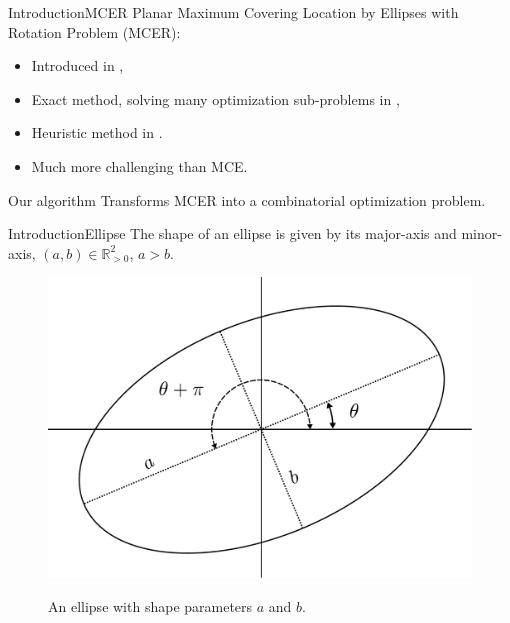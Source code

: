 \documentclass{beamer}
\theoremstyle{definition}
\begin{document}
\begin{frame}{Introduction}{MCER}
	Planar Maximum Covering Location by Ellipses with Rotation Problem (MCER):
	\begin{itemize}
		\item Introduced in \cite{andreta}, 
		\item Exact method, solving many optimization sub-problems in \cite{canbolat},
		\item Heuristic method in \cite{andreta}.
		\item Much more challenging than MCE.
	\end{itemize}
	
	\begin{block}{Our algorithm}		
		Transforms MCER into a combinatorial optimization problem.
	\end{block}
\end{frame}

\begin{frame}{Introduction}{Ellipse}
	The shape of an ellipse is given by its major-axis and minor-axis, $(a, b) \in \mathbb{R}^2_{>0}$, $a > b$.
	
	\begin{figure}[H]
		\centering
		
		\includegraphics[scale=.3]{../tex/figures/rotated_ellipse.pdf}
		\label{fig:ellipse_params}
		\caption{An ellipse with shape parameters $a$ and $b$.}
	\end{figure}
	
\end{frame}
\end{document}
